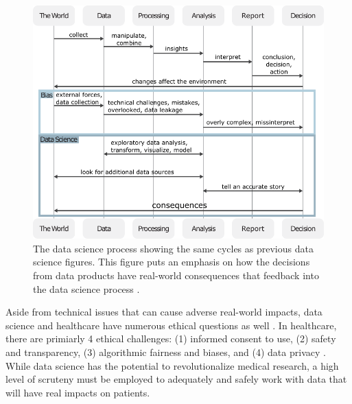 \documentclass[../main.tex]{subfiles}
\begin{document}
    \begin{figure}[!hbtp]
        \centering
        \includegraphics[scale=0.5]{figs/050-intro/data_science_figure}
        \caption[Data Science and It's Consequences]{
        The data science process showing the same cycles as previous data science figures.
        This figure puts an emphasis on how the decisions from data products have real-world consequences that feedback into
        the data science process \cite{Chen2020}.
        }
        \label{fig:data_science_consequences}
    \end{figure}

    Aside from technical issues that can cause adverse real-world impacts, data
    science and healthcare have numerous ethical questions as well
    \cite{gerkeEthicalLegalChallenges2020, peekThirtyYearsArtificial2015,
    phannonstanford.eduResearchersSayUse, rigbyEthicalDimensionsUsing2019,
    wetsmanWHOOutlinesPrinciples2021}.
    In healthcare, there are primiarly 4 ethical challenges:
    (1) informed consent to use,
    (2) safety and transparency,
    (3) algorithmic fairness and biases, and
    (4) data privacy
    \cite{gerkeEthicalLegalChallenges2020}.
    While data science has the potential to revolutionalize medical research,
    a high level of scruteny must be employed to adequately and safely work with
    data that will have real impacts on patients.









\end{document}
